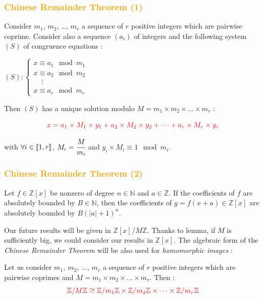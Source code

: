 \begin{frame}[fragile]
\frametitle{\textbf{\textcolor{orange}{Chinese Remainder Theorem (1)}}}

\begin{crt1}
Consider $m_1$, $m_2$, \ldots, $m_r$ a sequence of $r$ positive integers which are pairwise coprime. Consider also a sequence $(a_i)$ of integers and the following system $(S)$ of congruence equations :
\begin{center}
$(S) : \begin{cases}
x \equiv a_1 \mod m_1 \\
x \equiv a_2 \mod m_2 \\
\;\;\;\;\vdots \\
x \equiv a_r \mod m_r
\end{cases}$
\end{center}

Then $(S)$ has a unique solution modulo $M = m_1\times m_2\times \dots \times m_r$ :

$$\textcolor{red}{x = a_1 \times M_1 \times y_1 + a_2 \times M_2 \times y_2 + \dots + a_r \times M_r \times y_r}$$

with $\forall i \in \mbox{\textlbrackdbl} 1, r\mbox{\textrbrackdbl}$, $M_i = \cfrac{M}{m_i}$ and $y_i\times M_i \equiv 1 \mod m_i$.
\end{crt1}

\end{frame}

\begin{frame}[fragile]
\frametitle{\textbf{\textcolor{orange}{Chinese Remainder Theorem (2)}}}

\begin{Lemma}
Let $f \in \mathbb{Z}[x]$ be nonzero of degree $n\in\mathbb{N}$ and $a\in \mathbb{Z}$. If the coefficients of $f$ are absolutely bounded by $B\in\mathbb{N}$, then the coefficients of $g=f(x+a)\in\mathbb{Z}[x]$ are absolutely bounded by $B(|a|+1)^n$.
\end{Lemma}

Our future results will be given in $\mathbb{Z}[x]/M\mathbb{Z}$. Thanks to lemma, if $M$ is sufficiently big, we could consider our results in $\mathbb{Z}[x]$. The algebraic form of the \textit{Chinese Remainder Theorem} will be also used for \textit{homomorphic images} :

\begin{crt2}
Let us consider $m_1,\,m_2,\,...,\, m_r$ a sequence of $r$ positive integers which are pairwise coprimes and $M = m_1\times m_2\times \dots \times m_r$. Then :
 $$\textcolor{red}{\mathbb{Z}/M\mathbb{Z} \cong \mathbb{Z}/m_1\mathbb{Z} \times \mathbb{Z}/m_2\mathbb{Z} \times \dots \times \mathbb{Z}/m_r\mathbb{Z}}$$
\end{crt2}

\end{frame}
